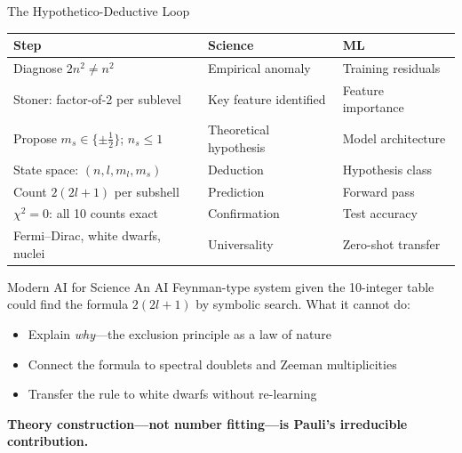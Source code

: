 \documentclass[aspectratio=169,12pt]{beamer}
\begin{document}
\begin{frame}[shrink=55]{The Hypothetico-Deductive Loop}

\begin{center}
\small
\renewcommand{\arraystretch}{1.25}
\begin{tabular}{p{4.2cm}p{4.2cm}p{4.2cm}}
\toprule
\textbf{Step} & \textbf{Science} & \textbf{ML} \\
\midrule
Diagnose $2n^2 \neq n^2$ & Empirical anomaly & Training residuals \\
Stoner: factor-of-2 per sublevel & Key feature identified & Feature importance \\
Propose $m_s\in\{\pm\tfrac{1}{2}\}$; $n_s\leq 1$ & Theoretical hypothesis & Model architecture \\
State space: $(n,l,m_l,m_s)$ & Deduction & Hypothesis class \\
Count $2(2l+1)$ per subshell & Prediction & Forward pass \\
$\chi^2 = 0$: all 10 counts exact & Confirmation & Test accuracy \\
Fermi--Dirac, white dwarfs, nuclei & Universality & Zero-shot transfer \\
\bottomrule
\end{tabular}
\end{center}

\bigskip
\begin{block}{Modern AI for Science}
An AI Feynman-type system given the 10-integer table could find the formula
$2(2l+1)$ by symbolic search.  What it cannot do:
\begin{itemize}
  \item Explain \emph{why}---the exclusion principle as a law of nature
  \item Connect the formula to spectral doublets and Zeeman multiplicities
  \item Transfer the rule to white dwarfs without re-learning
\end{itemize}
\textbf{Theory construction---not number fitting---is Pauli's irreducible contribution.}
\end{block}

\end{frame}
\end{document}
